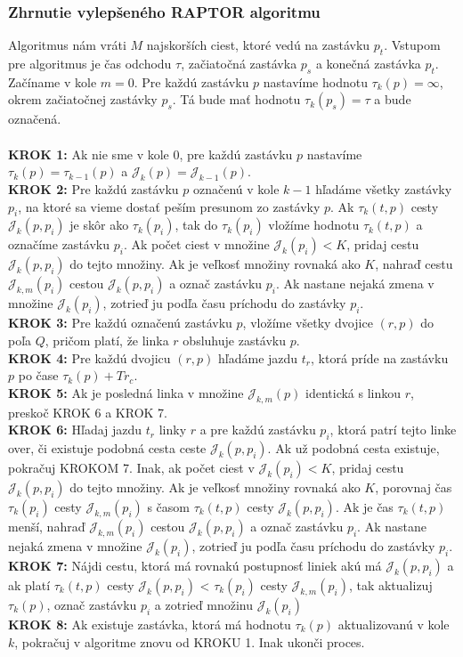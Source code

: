 \subsubsection{Zhrnutie vylepšeného RAPTOR algoritmu}
Algoritmus nám vráti $M$ najskorších ciest, ktoré vedú na zastávku $p_t$. Vstupom pre algoritmus je čas odchodu $\tau$, začiatočná zastávka $p_s$ a konečná zastávka $p_t$. Začíname v kole $m=0$. Pre každú zastávku $p$ nastavíme hodnotu $\tau_k(p)=\infty$, okrem začiatočnej zastávky $p_s$. Tá bude mať hodnotu $\tau_k(p_s)=\tau$ a bude označená.
\\
\\
\textbf{KROK 1:} Ak nie sme v kole $0$, pre každú zastávku $p$ nastavíme $\tau_k(p) = \tau_{k-1}(p)$ a $\mathcal{J}_k(p)=\mathcal{J}_{k-1}(p)$.\\
\textbf{KROK 2:} Pre každú zastávku $p$ označenú v kole $k-1$ hľadáme všetky zastávky $p_i$, na ktoré sa vieme dostať peším presunom zo zastávky $p$. Ak $\tau_k(t, p)$ cesty $\mathcal{J}_k(p, p_i)$ je skôr ako $\tau_k(p_i)$, tak do $\tau_k(p_i)$ vložíme hodnotu $\tau_k(t, p)$ a označíme zastávku $p_i$. Ak počet ciest v množine $\mathcal{J}_k(p_i) < K$, pridaj cestu $\mathcal{J}_k(p, p_i)$ do tejto množiny. Ak je veľkosť množiny rovnaká ako $K$, nahraď cestu $\mathcal{J}_{k,m}(p_i)$ cestou $\mathcal{J}_k(p, p_i)$ a označ zastávku $p_i$. Ak nastane nejaká zmena v množine $\mathcal{J}_k(p_i)$, zotrieď ju podľa času príchodu do zastávky $p_i$. \\
\textbf{KROK 3:} Pre každú označenú zastávku $p$, vložíme všetky dvojice $(r, p)$ do poľa $Q$, pričom platí, že linka $r$ obsluhuje zastávku $p$.\\
\textbf{KROK 4:} Pre každú dvojicu $(r, p)$ hľadáme jazdu $t_r$, ktorá príde na zastávku $p$ po čase $\tau_k(p) + Tr_c$.\\
\textbf{KROK 5:} Ak je posledná linka v množine $\mathcal{J}_{k,m}(p)$ identická s linkou $r$, preskoč KROK 6 a KROK 7.\\
\textbf{KROK 6:} Hľadaj jazdu $t_r$ linky $r$ a pre každú zastávku $p_i$, ktorá patrí tejto linke over, či existuje podobná cesta ceste $\mathcal{J}_k(p, p_i)$. Ak už podobná cesta existuje, pokračuj KROKOM 7. Inak, ak počet ciest v $\mathcal{J}_k(p_i) < K$, pridaj cestu $\mathcal{J}_k(p, p_i)$ do tejto množiny. Ak je veľkosť množiny rovnaká ako $K$, porovnaj čas $\tau_k(p_i)$ cesty $\mathcal{J}_{k,m}(p_i)$ s časom $\tau_k(t, p)$ cesty $\mathcal{J}_k(p, p_i)$. Ak je čas $\tau_k(t,p)$ menší, nahraď $\mathcal{J}_{k,m}(p_i)$ cestou $\mathcal{J}_k(p, p_i)$ a označ zastávku $p_i$.  Ak nastane nejaká zmena v množine $\mathcal{J}_k(p_i)$, zotrieď ju podľa času príchodu do zastávky $p_i$. \\
\textbf{KROK 7:} Nájdi cestu, ktorá má rovnakú postupnosť liniek akú má $\mathcal{J}_k(p, p_i)$ a ak platí $\tau_k(t, p)$ cesty $\mathcal{J}_k(p, p_i)$ < $\tau_k(p_i)$ cesty $\mathcal{J}_{k,m}(p_i)$, tak aktualizuj $\tau_k(p)$, označ zastávku $p_i$ a zotrieď množinu $\mathcal{J}_k(p_i)$\\
\textbf{KROK 8:} Ak existuje zastávka, ktorá má hodnotu $\tau_k(p)$ aktualizovanú v kole $k$, pokračuj v algoritme znovu od KROKU 1. Inak ukonči proces.

